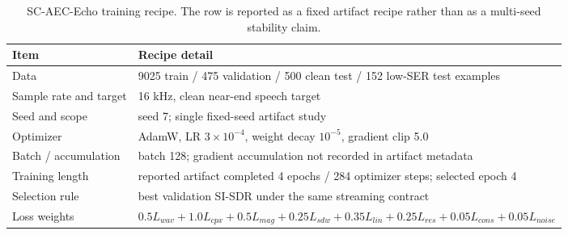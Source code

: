 \begin{table}[t]
\caption{SC-AEC-Echo training recipe. The row is reported as a fixed artifact recipe rather than as a multi-seed stability claim.}
\label{tab:scaec-recipe}
\centering
\small
\begin{tabular}{p{}p{}}
\hline
Item & Recipe detail \\
\hline
Data & 9025 train / 475 validation / 500 clean test / 152 low-SER test examples \\
Sample rate and target & 16 kHz, clean near-end speech target \\
Seed and scope & seed 7; single fixed-seed artifact study \\
Optimizer & AdamW, LR $3\times 10^{-4}$, weight decay $10^{-5}$, gradient clip 5.0 \\
Batch / accumulation & batch 128; gradient accumulation not recorded in artifact metadata \\
Training length & reported artifact completed 4 epochs / 284 optimizer steps; selected epoch 4 \\
Selection rule & best validation SI-SDR under the same streaming contract \\
Loss weights & $0.5L_{wav}+1.0L_{cpx}+0.5L_{mag}+0.25L_{sdw}+0.35L_{lin}+0.25L_{res}+0.05L_{cons}+0.05L_{noise}$ \\
\hline
\end{tabular}
\end{table}
